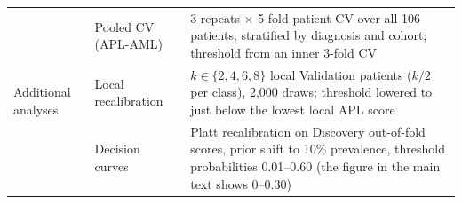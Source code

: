 {\begin{longtable}{p{3.0cm}p{5.6cm}p{8.3cm}}
\midrule
\multirow{3}{3.0cm}{Additional analyses} & Pooled CV (APL-AML) & 3 repeats $\times$ 5-fold patient CV over all 106 patients, stratified by diagnosis and cohort; threshold from an inner 3-fold CV \\
 & Local recalibration & $k\in\{2,4,6,8\}$ local Validation patients ($k/2$ per class), 2,000 draws; threshold lowered to just below the lowest local APL score \\
 & Decision curves & Platt recalibration on Discovery out-of-fold scores, prior shift to 10\% prevalence, threshold probabilities 0.01--0.60 (the figure in the main text shows 0--0.30) \\
\bottomrule
\end{longtable}}